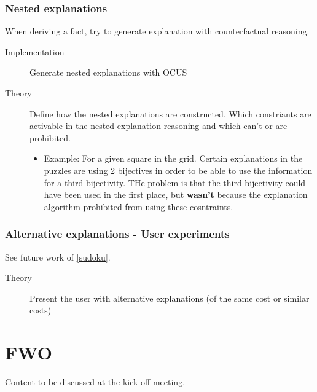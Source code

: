 \documentclass{article}
\newcommand\comment[1]{\marginpar{\tiny #1}}
\renewcommand\comment[1]{#1}
\newcommand{\todo}[1]{{\comment{\color{blue}#1}}}
\begin{document}
\subsubsection{Nested explanations}
When deriving a fact, try to generate explanation with counterfactual reasoning.
\begin{description}
  \item[Implementation] \todo{Generate nested explanations with OCUS}
  \item[Theory] \todo{Define how the nested explanations are constructed. Which constriants are activable in the nested explanation reasoning and which can't or are prohibited.}
  \begin{itemize}
    \item Example: For a given square in the grid. Certain explanations in the puzzles are using 2 bijectives in order to be able to use the information for a third bijectivity. THe problem is that the third bijectivity could have been used in the first place, but \textbf{wasn't} because the explanation algorithm prohibited from using these cosntraints.
  \end{itemize}
\end{description}

\subsubsection{Alternative explanations - User experiments}
See future work of \ref{sudoku}. 
\begin{description}
  \item[Theory] \todo{Present the user with alternative explanations (of the same cost or similar costs)}
\end{description}


\section{FWO}
Content to be discussed at the kick-off meeting.
\end{document}
